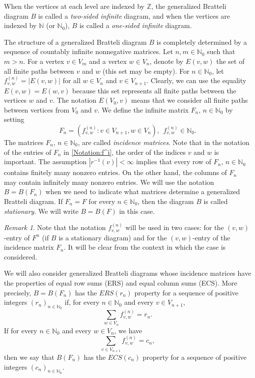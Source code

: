 \documentclass[11pt,reqno]{amsart}
\theoremstyle{definition}
\theoremstyle{remark}
\newtheorem{remark}[definition]{Remark}
\theoremstyle{plain}
\newcommand{\N}{\mathbb N}
\newcommand{\Z}{\mathbb Z}
\numberwithin{equation}{section}
\begin{document}
When the vertices
at each level are indexed by $\Z$, the generalized Bratteli diagram $B$ is called a \textit{two-sided infinite} diagram, and when the vertices are indexed by
$\N$ (or $\N_0$), $B$ is called a \textit{one-sided infinite} diagram.

The structure of a generalized Bratteli diagram $B$ is
completely determined by a sequence of countably infinite nonnegative matrices. Let $n,m \in \N_0$ such that $m>n$. For a vertex $v \in V_m$ and a vertex $w \in V_{n}$, denote
by $E(v, w)$ the set of all finite paths between $v$ and
$w$ (this set may be empty). For $n \in \N_0$, let $f^{(n)}_{v,w} = |E(v, w)|$ for all $w \in V_n$ and
$v \in V_{n+1}$. Clearly, we can use the equality $E(v, w) = E(w, v)$ because this set represents all finite paths between the vertices $w$ and $v$. The notation $E(V_0, v)$ means that we consider all finite paths between vertices from $V_0$ and $v$. We define the infinite matrix $F_n$, $n \in \N_0$ by setting 
\begin{equation}\label{Notation:f^i}
    F_n = (f^{(n)}_{v,w} : v \in V_{n+1}, w\in V_n),\ \   
    f^{(n)}_{v,w}  \in \N_0.
\end{equation} 
The matrices $F_n$, $n \in \N_0$, are called \textit{incidence matrices}. Note that in the notation of the entries of $F_n$ in \eqref{Notation:f^i}, the order of the indices $v$ and $w$ is important.
The assumption $|r^{-1}(v)| <
\infty$ implies that every row of $F_n$, $n \in \N_0$ contains finitely many
nonzero entries. On the other hand, the columns of $F_n$ may contain infinitely many nonzero entries.  
We will use the notation $B = B(F_n)$ when we need to indicate what matrices determine a generalized Bratteli diagram. If  $F_n = F$ for every $n \in \N_0$, then the diagram $B$ is called
\textit{stationary}. We will write $B = B(F)$ in this
case.

\begin{remark}
Note that the notation $f^{(n)}_{v,w}$ will be used in two cases: for the $(v,w)$-entry of $F^n$ (if $B$ is a stationary diagram) and for the $(v,w)$-entry of the incidence matrix $F_n$. It will be clear from the 
context in which the case is considered.
\end{remark}

We will also consider generalized Bratteli diagrams whose incidence matrices have the properties of equal row sums (ERS) and equal column sums (ECS). More precisely, $B = B(F_n)$ has the $ERS(r_n)$ property for a sequence of positive integers $(r_n)_{n \in \N_0}$ if, for every $n \in \N_0$ and every $v \in V_{n+1}$,
$$
\sum_{w\in V_n} f^{(n)}_{v,w} = r_n. 
$$ 
If for every $n \in \N_0$ and every $w \in V_{n}$, we have 
$$
\sum_{v\in V_{n+1}} f^{(n)}_{v,w} = c_n,
$$
then we say that $B(F_n)$ has the $ECS(c_n)$ property for a sequence of positive integers $(c_n)_{n \in \N_0}$.
\end{document}
